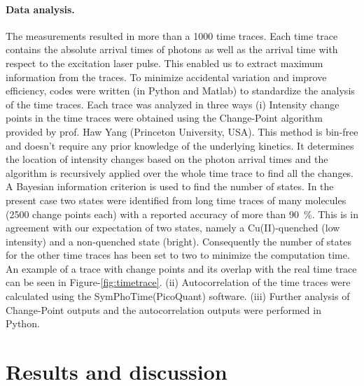 \documentclass[journal=jacsat,manuscript=article]{achemso}
\begin{document}
\paragraph*{Data analysis.}
The measurements resulted in more than a 1000 time traces.
Each time trace contains the absolute arrival times of photons as well as the arrival time with respect to the excitation laser pulse.
This enabled us to extract maximum information from the traces.
To minimize accidental variation and improve efficiency, codes were written (in Python and Matlab) to standardize the analysis of the time traces.
Each trace was analyzed in three ways (i) Intensity change points in the time traces were obtained using the Change-Point algorithm\cite{watkins2005detection} provided by prof. Haw Yang 
(Princeton University, USA).
This method is bin-free and doesn't require any prior knowledge of the underlying kinetics.
It determines the location of intensity changes based on the photon arrival times and the algorithm is recursively applied over the whole time trace to find all the changes.
A Bayesian information criterion is used to find the number of states.
In the present case two states were identified from long time traces of many molecules (2500 change points each) with a reported accuracy of more than \SI{90}{\percent}.
This is in agreement with our expectation of two states, namely a Cu(II)-quenched (low intensity) and a non-quenched state (bright).
Consequently the number of states for the other time traces has been set to two to minimize the computation time.
An example of a trace with change points and its overlap with the real time trace can be seen in Figure-\ref{fig:timetrace}.
(ii) Autocorrelation of the time traces were calculated using the SymPhoTime(PicoQuant) software.
(iii) Further analysis of Change-Point outputs and the autocorrelation outputs were performed in Python.

\section{Results and discussion\label{sec:results}}
\end{document}
